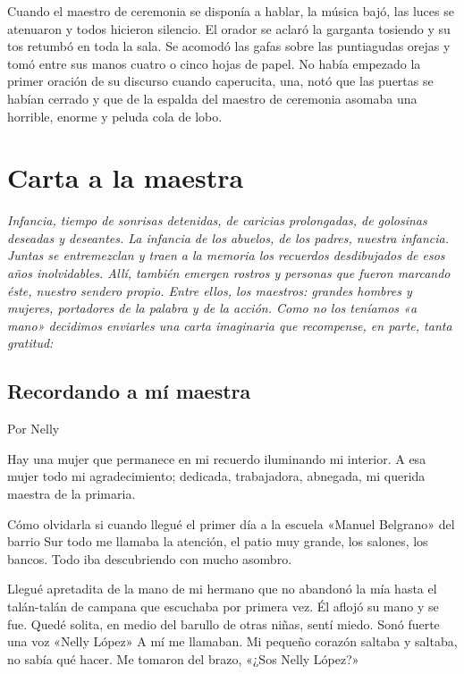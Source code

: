 \documentclass[11pt,twoside,openright,a5paper]{book}
\begin{document}
Cuando el maestro de ceremonia se disponía a hablar, la música bajó, las luces se atenuaron y todos hicieron silencio. El orador se aclaró la garganta tosiendo y su tos retumbó en toda la sala. Se acomodó las gafas sobre las puntiagudas orejas y tomó entre sus manos cuatro o cinco hojas de papel. No había empezado la primer oración de su discurso cuando caperucita, una, notó que las puertas se habían cerrado y que de la espalda del maestro de ceremonia asomaba una horrible, enorme y peluda cola de lobo.


\chapter*{Carta a la maestra}

\vspace{0.5cm}
\emph{Infancia, tiempo de sonrisas detenidas, de caricias prolongadas, de golosinas deseadas y deseantes. La infancia de los abuelos, de los padres, nuestra infancia. Juntas se entremezclan y traen a la memoria los recuerdos desdibujados de esos años inolvidables. Allí, también emergen rostros y personas que fueron marcando éste, nuestro sendero propio. Entre ellos, los maestros: grandes hombres y mujeres, portadores de la palabra y de la acción. Como no los teníamos «a mano» decidimos enviarles una carta imaginaria que recompense, en parte, tanta gratitud:}

\section*{Recordando a mí maestra}
                                                                                \begin{flushright}Por Nelly\end{flushright}

Hay una mujer que permanece en mi recuerdo iluminando mi interior. A esa mujer todo mi agradecimiento; dedicada, trabajadora, abnegada, mi querida maestra de la primaria.

Cómo olvidarla si cuando llegué  el primer día a la escuela «Manuel Belgrano» del barrio Sur todo me llamaba la atención, el patio muy grande, los salones, los bancos. Todo iba descubriendo con mucho asombro.

Llegué apretadita de la mano de mi hermano que no abandonó la mía hasta el talán-talán de campana que escuchaba por primera vez. Él  aflojó su mano y se fue. Quedé solita, en medio del barullo de otras niñas, sentí miedo. Sonó fuerte una voz «Nelly López» A mí me llamaban.  Mi pequeño corazón saltaba y saltaba, no sabía qué hacer. Me tomaron del brazo, «¿Sos Nelly López?»
\end{document}
